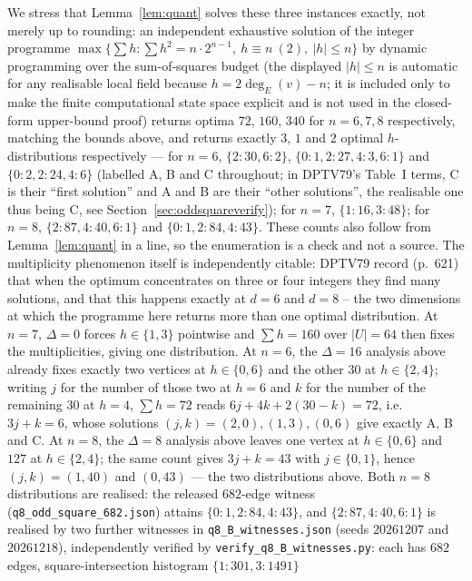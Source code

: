 \documentclass[12pt]{article}
\begin{document}
We stress that Lemma~\ref{lem:quant} solves these three instances
exactly, not merely up to rounding: an independent exhaustive solution
of the integer programme
$\max\{\sum h : \sum h^2=n\cdot2^{n-1},\ h\equiv n\ (2),\ |h|\le n\}$
by dynamic programming over the sum-of-squares budget (the displayed
$|h|\le n$ is automatic for any realisable local field because
$h=2\deg_E(v)-n$; it is included only to make the finite computational
state space explicit and is not used in the closed-form upper-bound proof) returns optima
$72$, $160$, $340$ for $n=6,7,8$ respectively, matching the bounds
above, and returns exactly $3$, $1$ and $2$ optimal $h$-distributions
respectively --- for $n=6$,
$\{2{:}30,6{:}2\}$, $\{0{:}1,2{:}27,4{:}3,6{:}1\}$ and
$\{0{:}2,2{:}24,4{:}6\}$ (labelled A, B and C throughout; in DPTV79's
Table~I terms, C is their ``first solution'' and A and B are their ``other
solutions'', the realisable one thus being C, see
Section~\ref{sec:oddsquareverify}); for $n=7$, $\{1{:}16,3{:}48\}$; for $n=8$,
$\{2{:}87,4{:}40,6{:}1\}$ and $\{0{:}1,2{:}84,4{:}43\}$.
These counts also follow from Lemma~\ref{lem:quant} in a line, so the
enumeration is a check and not a source. The multiplicity phenomenon itself
is independently citable: DPTV79 record (p.~621) that when the optimum
concentrates on three or four integers they find many solutions, and that
this happens exactly at $d=6$ and $d=8$ -- the two dimensions at which the
programme here returns more than one optimal distribution. At $n=7$, $\Delta=0$ forces
$h\in\{1,3\}$ pointwise and $\sum h=160$ over $|U|=64$ then fixes the
multiplicities, giving one distribution. At $n=6$, the $\Delta=16$ analysis
above already fixes exactly two vertices at $h\in\{0,6\}$ and the other
$30$ at $h\in\{2,4\}$; writing $j$ for the number of those two at $h=6$ and
$k$ for the number of the remaining $30$ at $h=4$, $\sum h=72$ reads
$6j+4k+2(30-k)=72$, i.e.\ $3j+k=6$, whose solutions
$(j,k)=(2,0),(1,3),(0,6)$ give exactly A, B and C. At
$n=8$, the $\Delta=8$ analysis above leaves one vertex at $h\in\{0,6\}$ and
$127$ at $h\in\{2,4\}$; the same count gives $3j+k=43$ with $j\in\{0,1\}$,
hence $(j,k)=(1,40)$ and $(0,43)$ --- the two distributions above. Both $n=8$
distributions are realised: the released $682$-edge witness
(\texttt{q8\_odd\_square\_682.json}) attains $\{0{:}1,2{:}84,4{:}43\}$,
and $\{2{:}87,4{:}40,6{:}1\}$ is realised by two further witnesses in
\texttt{q8\_B\_witnesses.json} (seeds $20261207$ and $20261218$),
independently verified by \texttt{verify\_q8\_B\_witnesses.py}:
each has $682$ edges, square-intersection histogram $\{1{:}301,3{:}1491\}$
\end{document}
